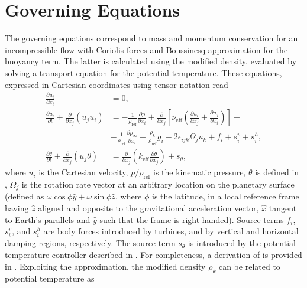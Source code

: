\section{Governing Equations}
\label{sec:governingEquations}
The governing equations correspond to mass and momentum conservation for an incompressible flow with Coriolis forces and Boussinesq approximation for the buoyancy term. The latter is calculated using the modified density, evaluated by solving a transport equation for the potential temperature. These equations, expressed in Cartesian coordinates using tensor notation read
\begin{align}
	\frac{\partial u_i}{\partial x_i} &= 0, \label{eq:massCartesian} \\
	\frac{\partial u_i}{\partial t} + \frac{\partial}{\partial x_j}\left(u_j u_i\right) &= -\frac{1}{\rho_\text{ref}}\frac{\partial p}{\partial x_i} + \frac{\partial}{\partial x_j}\left[\nu_\text{eff}\left(\frac{\partial u_i}{\partial x_j} + \frac{\partial u_j}{\partial x_i}\right)\right] + \nonumber \\ &-\frac{1}{\rho_\text{ref}}\frac{\partial p_{\infty}}{\partial x_i}+\frac{\rho_k}{\rho_\text{ref}}g_i - 2\epsilon_{ijk}\Omega_j u_k + f_i + s^v_i + s^h_i, \label{eq:momentumCartesian} \\
	\frac{\partial\theta}{\partial t} + \frac{\partial}{\partial x_j}\left(u_j\theta\right) &= \frac{\partial}{\partial x_j}\left(k_\text{eff}\frac{\partial \theta}{\partial x_j}\right) + s_\theta, \label{eq:temperatureCartesian}
\end{align}
where $u_i$ is the Cartesian velocity, $p/\rho_\text{ref}$ is the kinematic pressure, $\theta$ is defined in , $\Omega_j$ is the rotation rate vector at an arbitrary location on the planetary surface (defined as $\omega\cos\phi\widehat{y}+\omega\sin\phi\widehat{z}$, where $\phi$ is the latitude, in a local reference frame having $\widehat{z}$ aligned and opposite to the gravitational acceleration vector, $\widehat{x}$ tangent to Earth's parallels and $\widehat{y}$ such that the frame is right-handed). Source terms $f_i$, $s^v_i$, and $s^h_i$ are body forces introduced by turbines, and by vertical and horizontal damping regions, respectively. The source term $s_\theta$ is introduced by the potential temperature controller described in . For completeness, a derivation of  is provided in . Exploiting the \cite{Boussinesq1903} approximation, the modified density $\rho_k$ can be related to potential temperature as

